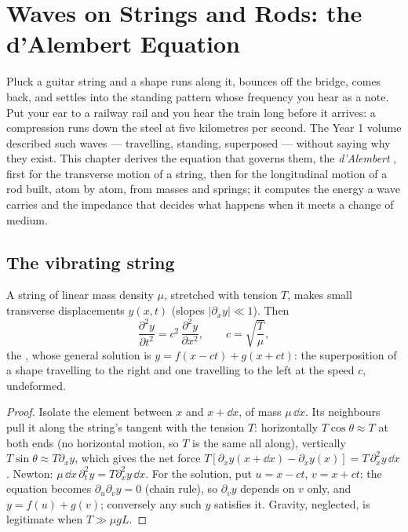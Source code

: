\chapter{Waves on Strings and Rods: the d'Alembert Equation}\label{ch:b2:waves-on-strings}

Pluck a guitar string and a shape runs along it, bounces off the
bridge, comes back, and settles into the standing pattern whose
frequency you hear as a note. Put your ear to a railway rail and you
hear the train long before it arrives: a compression runs down the
steel at five kilometres per second. The Year 1 volume described such
waves --- travelling, standing, superposed --- without saying why they
exist. This chapter derives the equation that governs them, the
\emph{d'Alembert }, first for the transverse motion of a
string, then for the longitudinal motion of a rod built, atom by atom,
from masses and springs; it computes the energy a wave carries and the
impedance that decides what happens when it meets a change of medium.

\section{The vibrating string}

\begin{theorem}\label{thm:b2:waves-on-strings:equation}
A string of linear mass density $\mu$, stretched with tension $T$, makes
small transverse displacements $y(x, t)$ (slopes $|\partial_xy| \ll 1$). Then
\[
\frac{\partial^2y}{\partial t^2} = c^2\,\frac{\partial^2y}{\partial x^2} ,
\qquad c = \sqrt{\frac{T}{\mu}} ,
\]
the \emph{}, whose general solution is $y = f(x - ct)
+ g(x + ct)$: the superposition of a shape travelling to the right and
one travelling to the left at the speed $c$, undeformed.
\end{theorem}

\begin{proof}
Isolate the element between $x$ and $x + \dd x$, of mass $\mu\,\dd x$. Its
neighbours pull it along the string's tangent with the tension $T$:
horizontally $T\cos\theta \approx T$ at both ends (no horizontal motion, so
$T$ is the same all along), vertically $T\sin\theta \approx T\partial_xy$, which
gives the net force $T[\partial_xy(x + \dd x) - \partial_xy(x)] = T\,\partial_x^2y\,\dd x$.
Newton: $\mu\,\dd x\,\partial_t^2y = T\partial_x^2y\,\dd x$. For the solution, put
$u = x - ct$, $v = x + ct$: the equation becomes $\partial_u\partial_vy = 0$
(chain rule), so $\partial_vy$ depends on $v$ only, and $y = f(u) + g(v)$;
conversely any such $y$ satisfies it. Gravity, neglected, is legitimate
when $T \gg \mu gL$.
\end{proof}

